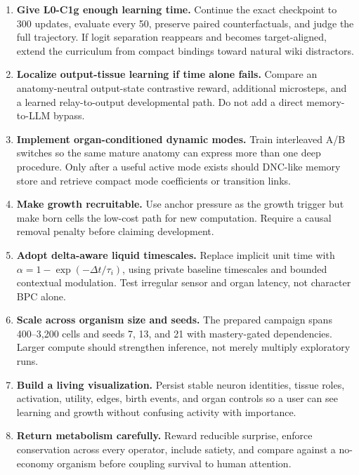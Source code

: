 \documentclass[11pt]{article}
\begin{document}
\begin{enumerate}
  \item \textbf{Give L0-C1g enough learning time.} Continue the exact checkpoint to 300
        updates, evaluate every 50, preserve paired counterfactuals, and judge the full
        trajectory. If logit separation reappears and becomes target-aligned, extend the
        curriculum from compact bindings toward natural wiki distractors.
  \item \textbf{Localize output-tissue learning if time alone fails.} Compare an
        anatomy-neutral output-state contrastive reward, additional microsteps, and a
        learned relay-to-output developmental path. Do not add a direct memory-to-LLM
        bypass.
  \item \textbf{Implement organ-conditioned dynamic modes.} Train interleaved A/B
        switches so the same mature anatomy can express more than one deep procedure.
        Only after a useful active mode exists should DNC-like memory store and retrieve
        compact mode coefficients or transition links.
  \item \textbf{Make growth recruitable.} Use anchor pressure as the growth trigger but
        make born cells the low-cost path for new computation. Require a causal removal
        penalty before claiming development.
  \item \textbf{Adopt delta-aware liquid timescales.} Replace implicit unit time with
        $\alpha=1-\exp(-\Delta t/\tau_i)$, using private baseline timescales and bounded
        contextual modulation. Test irregular sensor and organ latency, not character
        BPC alone.
  \item \textbf{Scale across organism size and seeds.} The prepared campaign spans
        400--3,200 cells and seeds 7, 13, and 21 with mastery-gated dependencies. Larger
        compute should strengthen inference, not merely multiply exploratory runs.
  \item \textbf{Build a living visualization.} Persist stable neuron identities,
        tissue roles, activation, utility, edges, birth events, and organ controls so a
        user can see learning and growth without confusing activity with importance.
  \item \textbf{Return metabolism carefully.} Reward reducible surprise, enforce
        conservation across every operator, include satiety, and compare against a
        no-economy organism before coupling survival to human attention.
\end{enumerate}
\end{document}
